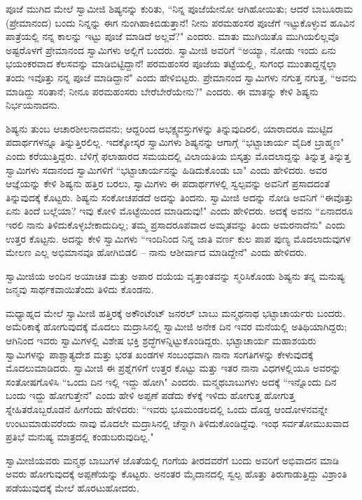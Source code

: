 ಪೂಜೆ ಮುಗಿದ ಮೇಲೆ ಸ್ವಾಮೀಜಿ ಶಿಷ್ಯನನ್ನು ಕುರಿತು, “ನಿನ್ನ ಪೂಜೆಯೇನೋ ಆಗಿಹೋಯಿತು; ಆದರೆ ಬಾಬೂರಾಮ (ಪ್ರೇಮಾನಂದ) ಬಂದು ನಿನ್ನನ್ನು ಈಗ ನುಂಗಿಹಾಕಿಬಿಡುತ್ತಾನೆ! ನೀನು ಪರಮಹಂಸರ ಪೂಜೆಗೆ ಇಟ್ಟುಕೊಳ್ಳುವ ಹೂವಿನ ಪಾತ್ರೆಯಲ್ಲಿ ನನ್ನ ಕಾಲನ್ನು ಇಟ್ಟು ಪೂಜೆ ಮಾಡಿದೆ ಅಲ್ಲವೆ?" ಎಂದರು. ಮಾತು ಮುಗಿಯಿತೊ ಮುಗಿಯಲಿಲ್ಲವೊ ಅಷ್ಟರೊಳಗೆ ಪ್ರೇಮಾನಂದ ಸ್ವಾಮಿಗಳು ಅಲ್ಲಿಗೆ ಬಂದರು. ಸ್ವಾಮೀಜಿ ಅವರಿಗೆ “ಅಯ್ಯಾ, ನೋಡು ಇಂದು ಏನು ಭಯಂಕರವಾದ ಕೆಲಸವನ್ನು ಮಾಡಿಬಿಟ್ಟಿದ್ದಾನೆ! ಪರಮಹಂಸರ ಪೂಜೆಯ ತಟ್ಟೆಯಲ್ಲಿ, ಸುಗಂಧ ಮುಂತಾದ್ದನ್ನೆಲ್ಲಾ ತಂದು ಇವೊತ್ತು ನನ್ನ ಪೂಜೆ ಮಾಡಿದ್ದಾನೆ" ಎಂದು ಹೇಳಿಬಿಟ್ಟರು. ಪ್ರೇಮಾನಂದ ಸ್ವಾಮಿಗಳು ನಗುತ್ತ ನಗುತ್ತ, “ಅವನು ಮಾಡಿದ್ದು ಸರಿತಾನೆ; ನೀನೂ ಪರಮಹಂಸರು ಬೇರೆಬೇರೆಯೇನು?" ಎಂದರು. ಈ ಮಾತನ್ನು ಕೇಳಿ ಶಿಷ್ಯನು ನಿರ್ಭಯನಾದನು.

ಶಿಷ್ಯನು ತುಂಬ ಆಚಾರಶೀಲನಾದವನು; ಆದ್ದರಿಂದ ಅಭಕ್ಷ್ಯವಸ್ತುಗಳನ್ನು ತಿನ್ನುವುದಿರಲಿ, ಯಾರಾದರೂ ಮುಟ್ಟಿದ ಪದಾರ್ಥಗಳನ್ನೂ ತಿನ್ನುತ್ತಿರಲಿಲ್ಲ. ಇದಕ್ಕೋಸ್ಕರ ಸ್ವಾಮಿಗಳು ಶಿಷ್ಯನನ್ನು ಆಗಾಗ್ಗೆ “ಭಟ್ಟಾಚಾರ್ಯ ವೈದಿಕ ಬ್ರಾಹ್ಮಣ" ಎಂದು ಕರೆಯುತ್ತಿದ್ದರು. ಬೆಳಿಗ್ಗೆ ಫಲಾಹಾರದ ಸಮಯದಲ್ಲಿ ವಿಲಾಯತಿಯ ಬಿಸ್ಕತ್ತು ಮೊದಲಾದ್ದನ್ನು ತಿನ್ನುತ್ತ ತಿನ್ನುತ್ತ ಸ್ವಾಮಿಗಳು ಸದಾನಂದ ಸ್ವಾಮಿಗಳಿಗೆ “ಭಟ್ಟಾಚಾರ್ಯನನ್ನು ಹಿಡಿದುಕೊಂಡು ಬಾ" ಎಂದು ಹೇಳಿದರು. ಅವರ ಆಜ್ಞೆಯನ್ನು ಕೇಳಿ ಶಿಷ್ಯನು ಹತ್ತಿರ ಬರಲು, ಸ್ವಾಮಿಗಳು ಈ ಪದಾರ್ಥಗಳಲ್ಲಿ ಸ್ವಲ್ಪವನ್ನು ಅವನಿಗೆ ಪ್ರಸಾದದಂತೆ ತಿನ್ನುವುದಕ್ಕೆ ಕೊಟ್ಟರು. ಶಿಷ್ಯನು ಸಂಕೋಚಪಡದೆ ಅದನ್ನು ತಿಂದನು. ಸ್ವಾಮೀಜಿ ಅದನ್ನು ನೋಡಿ ಅವನಿಗೆ “ಈವೊತ್ತು ಏನು ತಿಂದೆ ಬಲ್ಲೆಯಾ? ಇವು ಕೋಳಿ ಮೊಟ್ಟೆಯಿಂದ ಮಾಡಿದುವು!" ಎಂದು ಹೇಳಿದರು. ಅದಕ್ಕೆ ಅವನು “ಏನಾದರೂ ಇರಲಿ ನಾನು ತಿಳಿದುಕೊಳ್ಳಬೇಕಾದುದಿಲ್ಲ; ತಮ್ಮ ಪ್ರಸಾದರೂಪವಾದ ಅಮೃತವನ್ನು ತಿಂದು ಅಮರನಾದೆನು" ಎಂದು ಉತ್ತರ ಕೊಟ್ಟನು. ಅದನ್ನು ಕೇಳಿ ಸ್ವಾಮಿಗಳು “ಇಂದಿನಿಂದ ನಿನ್ನ ಜಾತಿ ವರ್ಣ ಕುಲ ಪಾಪ ಪುಣ್ಯ ಮೊದಲಾದುವುಗಳ ಮೇಲಣ ಎಲ್ಲ ಅಭಿಮಾನವೂ ಹೋಗಿಬಿಡಲಿ – ನಾನು ಆಶೀರ್ವಾದ ಮಾಡಿದ್ದೇನೆ" ಎಂದು ಹೇಳಿದರು.

ಸ್ವಾಮೀಜಿಯ ಅಂದಿನ ಅಯಾಚಿತ ಮತ್ತು ಅಪಾರ ದಯೆಯ ವೃತ್ತಾಂತವನ್ನು ಸ್ಮರಿಸಿಕೊಂಡು ಶಿಷ್ಯನು ತನ್ನ ಮನುಷ್ಯ ಜನ್ಮವು ಸಾರ್ಥಕವಾಯಿತೆಂದು ತಿಳಿದು ಕೊಂಡನು.

ಮಧ್ಯಾಹ್ನದ ಮೇಲೆ ಸ್ವಾಮೀಜಿ ಹತ್ತಿರಕ್ಕೆ ಅಕೌಂಟೆಂಟ್ ಜನರಲ್ ಬಾಬು ಮನ್ಮಥನಾಥ ಭಟ್ಟಾಚಾರ್ಯರು ಬಂದರು. ಅಮೆರಿಕಾಕ್ಕೆ ಹೋಗುವುದಕ್ಕೆ ಮೊದಲು ಮದ್ರಾಸಿನಲ್ಲಿ ಸ್ವಾಮೀಜಿ ಅನೇಕ ದಿನ ಇವರ ಮನೆಯಲ್ಲಿ ಅತಿಥಿಯಾಗಿದ್ದರು; ಆಗಿನಿಂದ ಇವರು ಸ್ವಾಮಿಗಳಲ್ಲಿ ವಿಶೇಷ ಭಕ್ತಿ ಶ್ರದ್ಧೆಗಳನ್ನಿಟ್ಟುಕೊಂಡಿದ್ದರು. ಭಟ್ಟಾಚಾರ್ಯ ಮಹಾಶಯರು ಸ್ವಾಮಿಗಳನ್ನು ಪಾಶ್ಚಾತ್ಯದೇಶ ಮತ್ತು ಭರತ ಖಂಡಗಳ ಸಂಬಂಧವಾಗಿ ನಾನಾ ಸಂಗತಿಗಳನ್ನು ಕೇಳುವುದಕ್ಕೆ ಮೊದಲುಮಾಡಿದರು. ಸ್ವಾಮೀಜಿ ಈ ಪ್ರಶ್ನೆಗಳಿಗೆ ಉತ್ತರ ಕೊಟ್ಟು ಮತ್ತು ಇತರ ನಾನಾ ವಿಧಗಳಲ್ಲಿಯೂ ಅವರನ್ನು ಸಂತೋಷಗೊಳಿಸಿ “ಒಂದು ದಿನ ಇಲ್ಲಿ ಇದ್ದು ಹೋಗಿ" ಎಂದರು. ಮನ್ಮಥಬಾಬುಗಳು ಅದಕ್ಕೆ “ಇನ್ನೊಂದು ದಿನ ಬಂದು ಇದ್ದು ಹೋಗುತ್ತೇನೆ" ಎಂದು ಹೇಳಿ ಅಪ್ಪಣೆ ಪಡೆದು ಕೆಳಕ್ಕೆ ಇಳಿದು ಹೋಗುತ್ತ ಹೋಗುತ್ತ ಸ್ನೇಹಿತರೊಬ್ಬರೊಡನೆ ಹೀಗೆಂದು ಹೇಳಿದರು: “ಇವರು ಭೂಮಂಡಲದಲ್ಲಿ ಒಂದು ದೊಡ್ಡ ಆಂದೋಳನವನ್ನೇ ಉಂಟುಮಾಡುವರೆಂದು ನಾವು ಮೊದಲೇ ಮದ್ರಾಸಿನಲ್ಲಿ ಚೆನ್ನಾಗಿ ತಿಳಿದುಕೊಂಡಿದ್ದೆವು. ಇಂಥ ಸರ್ವತೋಮುಖವಾದ ಪ್ರತಿಭೆ ಮನುಷ್ಯ ಮಾತ್ರದಲ್ಲಿ ಕಂಡುಬರುವುದಿಲ್ಲ."

ಸ್ವಾಮೀಜಿಯವರು ಮನ್ಮಥ ಬಾಬುಗಳ ಜೊತೆಯಲ್ಲಿ ಗಂಗೆಯ ತೀರದವರೆಗೆ ಬಂದು ಅವರಿಗೆ ಅಭಿವಾದನ ಮಾಡಿ ಅವರು ಹೋಗುವುದಕ್ಕೆ ಅಪ್ಪಣೆಯನ್ನು ಕೊಟ್ಟರು. ಅನಂತರ ಮೈದಾನದಲ್ಲಿ ಸ್ವಲ್ಪ ಹೊತ್ತು ತಿರುಗಾಡುತ್ತಿದ್ದು ವಿಶ್ರಾಂತಿ ಪಡೆಯುವುದಕ್ಕೆ ಮೇಲೆ ಹೊರಟುಹೋದರು.


